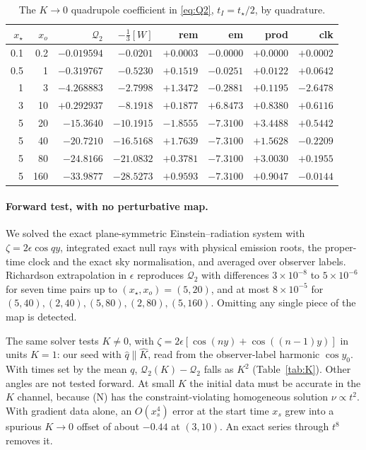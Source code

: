 \documentclass[10pt]{article}
\newcommand{\eps}{\epsilon}
\newcommand{\Q}{\mathcal Q_2}
\newcommand{\Kh}{\hat K}
\newcommand{\qh}{\hat q}
\begin{document}
\begin{table}[h]
\centering
\begin{tabular}{rrrrrrrr}
\toprule
$x_\star$ & $x_o$ & $\Q$ & $-\frac13[W]$ & rem & em & prod & clk\\
\midrule
0.1 & 0.2 & $-0.019594$ & $-0.0201$ & $+0.0003$ & $-0.0000$ & $+0.0000$ & $+0.0002$\\
0.5 & 1 & $-0.319767$ & $-0.5230$ & $+0.1519$ & $-0.0251$ & $+0.0122$ & $+0.0642$\\
1 & 3 & $-4.268883$ & $-2.7998$ & $+1.3472$ & $-0.2881$ & $+0.1195$ & $-2.6478$\\
3 & 10 & $+0.292937$ & $-8.1918$ & $+0.1877$ & $+6.8473$ & $+0.8380$ & $+0.6116$\\
5 & 20 & $-15.3640$ & $-10.1915$ & $-1.8555$ & $-7.3100$ & $+3.4488$ & $+0.5442$\\
5 & 40 & $-20.7210$ & $-16.5168$ & $+1.7639$ & $-7.3100$ & $+1.5628$ & $-0.2209$\\
5 & 80 & $-24.8166$ & $-21.0832$ & $+0.3781$ & $-7.3100$ & $+3.0030$ & $+0.1955$\\
5 & 160 & $-33.9877$ & $-28.5273$ & $+0.9593$ & $-7.3100$ & $+0.9047$ & $-0.0144$\\
\bottomrule
\end{tabular}
\caption{The $K\to0$ quadrupole coefficient in \eqref{eq:Q2}, $t_I=t_\star/2$, by quadrature.}\label{tab:Q}
\end{table}

\paragraph{Forward test, with no perturbative map.} We solved the exact plane-symmetric Einstein--radiation system with $\zeta=2\eps\cos qy$, integrated exact null rays with physical emission roots, the proper-time clock and the exact sky normalisation, and averaged over observer labels. Richardson extrapolation in $\eps$ reproduces $\Q$ with differences $3\times10^{-8}$ to $5\times10^{-6}$ for seven time pairs up to $(x_\star,x_o)=(5,20)$, and at most $8\times10^{-5}$ for $(5,40),(2,40),(5,80),(2,80),(5,160)$. Omitting any single piece of the map is detected.

The same solver tests $K\ne0$, with $\zeta=2\eps[\cos(ny)+\cos((n-1)y)]$ in units $K=1$: our seed with $\qh\parallel\Kh$, read from the observer-label harmonic $\cos y_0$. With times set by the mean $q$, $\Q(K)-\Q$ falls as $K^2$ (Table~\ref{tab:K}). Other angles are not tested forward. At small $K$ the initial data must be accurate in the $K$ channel, because (N) has the constraint-violating homogeneous solution $\nu\propto t^2$. With gradient data alone, an $O(x_s^4)$ error at the start time $x_s$ grew into a spurious $K\to0$ offset of about $-0.44$ at $(3,10)$. An exact series through $t^8$ removes it.
\end{document}
